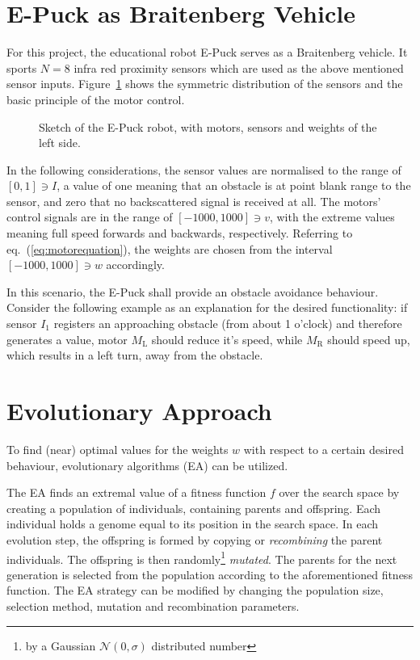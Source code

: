 \documentclass[a4paper]{jacow}
\begin{document}
\section{E-Puck as Braitenberg Vehicle}

For this project, the educational robot E-Puck serves as a Braitenberg vehicle. It sports $N=8$ infra red proximity sensors which are used as the above mentioned sensor inputs. Figure~\ref{fig:epuck} shows the symmetric distribution of the sensors and the basic principle of the motor control.

\begin{figure}[hbt]
	\centering
	
	\caption{Sketch of the E-Puck robot, with motors, sensors and weights of the left side.}
	\label{fig:epuck}
\end{figure}

In the following considerations, the sensor values are normalised to the range of $[0,1]\ni I$, a value of one meaning that an obstacle is at point blank range to the sensor, and zero that no backscattered signal is received at all. The motors' control signals are in the range of $[-1000,1000]\ni v$, with the extreme values meaning full speed forwards and backwards, respectively. Referring to eq.~(\ref{eq:motorequation}), the weights are chosen from the interval $[-1000,1000]\ni w$ accordingly.

In this scenario, the E-Puck shall provide an obstacle avoidance behaviour. Consider the following example as an explanation for the desired functionality: if sensor $I_1$ registers an approaching obstacle (from about 1 o'clock) and therefore generates a value, motor $M_\mathrm{L}$ should reduce it's speed, while $M_\mathrm{R}$ should speed up, which results in a left turn, away from the obstacle.

\section{Evolutionary Approach}

To find (near) optimal values for the weights $w$ with respect to a certain desired behaviour, evolutionary algorithms (EA) can be utilized.

The EA finds an extremal value of a fitness function $f$ over the search space by creating a population of individuals, containing parents and offspring. Each individual holds a genome equal to its position in the search space. In each evolution step, the offspring is formed by copying or \emph{recombining} the parent individuals. The offspring is then randomly\footnote{by a Gaussian $\mathcal{N}(0,\sigma)$ distributed number} \emph{mutated}. The parents for the next generation is selected from the population according to the aforementioned fitness function. The EA strategy can be modified by changing the population size, selection method, mutation and recombination parameters.
\end{document}
